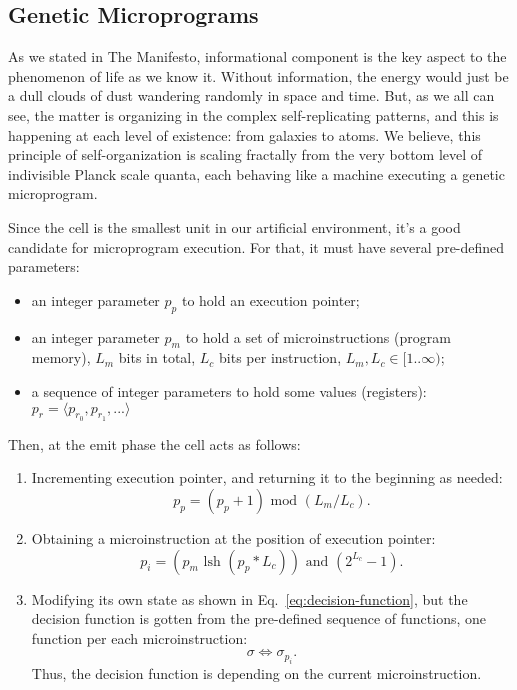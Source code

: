 \documentclass[a4paper,12pt,tikz,UTF8]{article}
\begin{document}
  \subsection{Genetic Microprograms}

    As we stated in The Manifesto, informational component is the key aspect to the phenomenon of life as we know it. Without information, the energy would just be a dull clouds of dust wandering randomly in space and time. But, as we all can see, the matter is organizing in the complex self-replicating patterns, and this is happening at each level of existence: from galaxies to atoms. We believe, this principle of self-organization is scaling fractally from the very bottom level of indivisible Planck scale quanta, each behaving like a machine executing a genetic microprogram.

    Since the cell is the smallest unit in our artificial environment, it's a good candidate for microprogram execution. For that, it must have several pre-defined parameters:
    \begin{itemize}
      \item an integer parameter $p_p$ to hold an execution pointer;
      \item an integer parameter $p_m$ to hold a set of microinstructions (program memory), $L_m$ bits in total, $L_c$ bits per instruction, $L_m, L_c \in {[1 .. \infty)}$;
      \item a sequence of integer parameters to hold some values (registers): $p_r = \langle p_{r_0}, p_{r_1}, ... \rangle$ 
    \end{itemize}

    Then, at the emit phase the cell acts as follows:
    \begin{enumerate}
      \item Incrementing execution pointer, and returning it to the beginning as needed:
        \begin{equation}
          p_p = (p_p + 1) \text{ mod } (L_m / L_c).
        \end{equation}
      \item Obtaining a microinstruction at the position of execution pointer:
        \begin{equation}
          p_i = (p_m \text{ lsh } (p_p * L_c)) \text{ and } (2^{L_c} - 1).
        \end{equation}
      \item Modifying its own state as shown in Eq.~\ref{eq:decision-function}, but the decision function is gotten from the pre-defined sequence of functions, one function per each microinstruction:
        \begin{equation}
          \sigma \Leftrightarrow \sigma_{p_i}.
        \end{equation}
        Thus, the decision function is depending on the current microinstruction.
    \end{enumerate}
\end{document}
